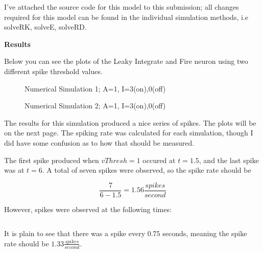 \documentclass[a4paper,12pt]{article}
\begin{document}
\vspace{2mm}

I've attached the source code for this model to this submission; all changes required for this model can be found in the individual simulation methods, i.e solveRK, solveE, solveRD. 

\vfil\eject

{\bf Results}
\bigskip

Below you can see the plots of the Leaky Integrate and Fire neuron using two different spike threshold values. 

\begin{figure}[h!]
\begin{center}
\end{center}
\caption{\label{pict4}Numerical Simulation 1; A=1, I=3(on),0(off)}
\end{figure}

\begin{figure}[h!]
\begin{center}
\end{center}
\caption{\label{pict5}Numerical Simulation 2; A=1, I=3(on),0(off)}
\end{figure}

\vfil\eject

The results for this simulation produced a nice series of spikes. The plots will be on the next page. The spiking rate was calculated for each simulation, though I did have some confusion as to how that should be measured. 

\vspace{2mm}

The first spike produced when $vThresh=1$ occured at $t=1.5$, and the last spike was at $t=6$. A total of seven spikes were observed, so the spike rate should be 

\begin{equation}
\frac{7}{6-1.5} = 1.56 \frac{spikes}{second}
\end{equation}

However, spikes were observed at the following times:

\begin{equation}
[ 1.5, 2.25, 3, 3.75, 4.5, 5.25, 6 ]
\end{equation}

It is plain to see that there was a spike every $0.75$ seconds, meaning the spike rate should be $1.33 \frac{spikes}{second}$. 
\end{document}
